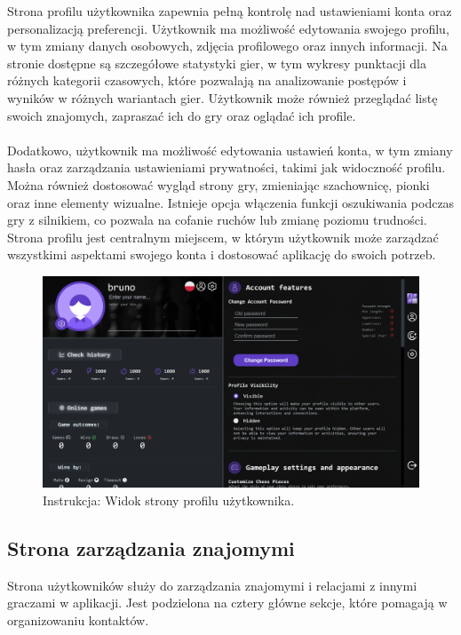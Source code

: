 \documentclass[12pt,a4paper]{article}
\begin{document}
\noindent
Strona profilu użytkownika zapewnia pełną kontrolę nad ustawieniami konta oraz personalizacją preferencji. Użytkownik ma możliwość edytowania swojego profilu, w tym zmiany danych osobowych, zdjęcia profilowego oraz innych informacji. Na stronie dostępne są szczegółowe statystyki gier, w tym wykresy punktacji dla różnych kategorii czasowych, które pozwalają na analizowanie postępów i wyników w różnych wariantach gier. Użytkownik może również przeglądać listę swoich znajomych, zapraszać ich do gry oraz oglądać ich profile.
\\\\
Dodatkowo, użytkownik ma możliwość edytowania ustawień konta, w tym zmiany hasła oraz zarządzania ustawieniami prywatności, takimi jak widoczność profilu. Można również dostosować wygląd strony gry, zmieniając szachownicę, pionki oraz inne elementy wizualne. Istnieje opcja włączenia funkcji oszukiwania podczas gry z silnikiem, co pozwala na cofanie ruchów lub zmianę poziomu trudności. Strona profilu jest centralnym miejscem, w którym użytkownik może zarządzać wszystkimi aspektami swojego konta i dostosować aplikację do swoich potrzeb.

\vspace{0.5cm}
\begin{figure}[h!]
    \centering
    \includegraphics[width=1\textwidth]{images/ins_account.png}
    \caption{Instrukcja: Widok strony profilu użytkownika.}
\end{figure}

\newpage

\subsection{Strona zarządzania znajomymi}

\noindent
Strona użytkowników służy do zarządzania znajomymi i relacjami z innymi graczami w aplikacji. Jest podzielona na cztery główne sekcje, które pomagają w organizowaniu kontaktów.
\end{document}
